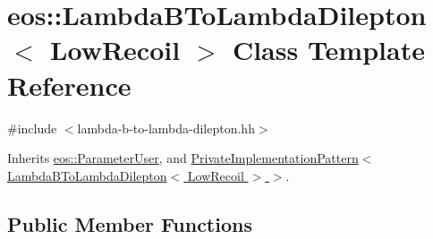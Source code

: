 \hypertarget{classeos_1_1LambdaBToLambdaDilepton_3_01LowRecoil_01_4}{
\section{eos::LambdaBToLambdaDilepton$<$ LowRecoil $>$ Class Template Reference}
\label{classeos_1_1LambdaBToLambdaDilepton_3_01LowRecoil_01_4}
}


{\ttfamily \#include $<$lambda-\/b-\/to-\/lambda-\/dilepton.hh$>$}

Inherits \hyperlink{classeos_1_1ParameterUser}{eos::ParameterUser}, and \hyperlink{classeos_1_1PrivateImplementationPattern}{PrivateImplementationPattern$<$ LambdaBToLambdaDilepton$<$ LowRecoil $>$ $>$}.\subsection*{Public Member Functions}
